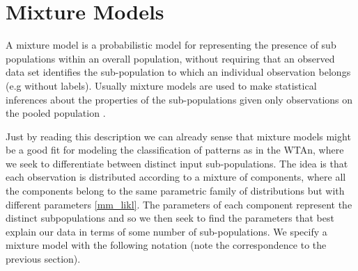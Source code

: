 \documentclass{article}
\begin{document}
\section{Mixture Models}
A mixture model is a probabilistic model for representing the presence
of sub populations within an overall population, without requiring that
an observed data set identifies the sub-population to which an
individual observation belongs (e.g without labels). Usually mixture models are used to make
statistical inferences about the properties of the sub-populations given
only observations on the pooled population \cite{Mixture_model}.
 
Just by reading this description we can already sense that mixture
models might be a good fit for modeling the classification of patterns as
in the WTAn, where we seek to differentiate between distinct input sub-populations. The idea is
that each observation is distributed according to a mixture of components, where all the components belong to the same parametric family of distributions but with different parameters \eqref{mm_likl}. The parameters of each component represent the distinct subpopulations and so we then seek to find the parameters that best explain our data in terms of some number of sub-populations. We specify a mixture model with the following notation (note the correspondence to the previous section).
 
\end{document}
